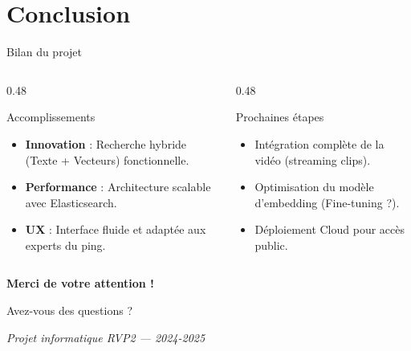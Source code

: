 \section{Conclusion}

\begin{frame}{Bilan du projet}
    \begin{columns}[T,onlytextwidth]
        \begin{column}{0.48\textwidth}
            \begin{block}{ Accomplissements}
                \begin{itemize}\small
                    \item \textbf{Innovation} : Recherche hybride (Texte + Vecteurs) fonctionnelle.
                    \item \textbf{Performance} : Architecture scalable avec Elasticsearch.
                    \item \textbf{UX} : Interface fluide et adaptée aux experts du ping.
                \end{itemize}
            \end{block}
        \end{column}
        \begin{column}{0.48\textwidth}
            \begin{block}{Prochaines étapes}
                \begin{itemize}\small
                    \item Intégration complète de la vidéo (streaming clips).
                    \item Optimisation du modèle d'embedding (Fine-tuning ?).
                    \item Déploiement Cloud pour accès public.
                \end{itemize}
            \end{block}
        \end{column}
    \end{columns}
\end{frame}

\begin{frame}[plain]
    \centering
    \vspace{1.5cm}
    
    {\Huge \textbf{Merci de votre attention !}}
    
    \vspace{1cm}
    
    {\Large Avez-vous des questions ?}
    
    \vspace{2cm}
    
    \small
    \textit{Projet informatique RVP2 — 2024-2025}
\end{frame}

